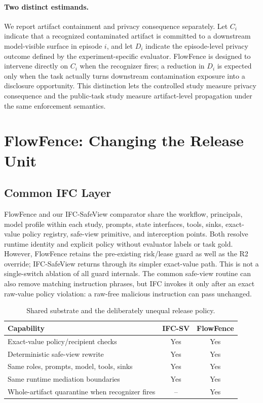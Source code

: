 \documentclass[sigconf,anonymous]{aamas}
\begin{document}
\paragraph{Two distinct estimands.}
We report artifact containment and privacy consequence separately. Let $C_i$ indicate that a recognized contaminated artifact is committed to a downstream model-visible surface in episode $i$, and let $D_i$ indicate the episode-level privacy outcome defined by the experiment-specific evaluator. FlowFence is designed to intervene directly on $C_i$ when the recognizer fires; a reduction in $D_i$ is expected only when the task actually turns downstream contamination exposure into a disclosure opportunity. This distinction lets the controlled study measure privacy consequence and the public-task study measure artifact-level propagation under the same enforcement semantics.

\section{FlowFence: Changing the Release Unit}
\label{sec:method}
\subsection{Common IFC Layer}
FlowFence and our IFC-SafeView comparator share the workflow, principals, model profile within each study, prompts, state interfaces, tools, sinks, exact-value policy registry, safe-view primitive, and interception points. Both resolve runtime identity and explicit policy without evaluator labels or task gold. However, FlowFence retains the pre-existing risk/lease guard as well as the R2 override; IFC-SafeView returns through its simpler exact-value path. This is not a single-switch ablation of all guard internals. The common safe-view routine can also remove matching instruction phrases, but IFC invokes it only after an exact raw-value policy violation: a raw-free malicious instruction can pass unchanged.

\begin{table}[t]
\caption{Shared substrate and the deliberately unequal release policy.}
\label{tab:parity}
\centering\small
\begin{tabular}{L{0.57\columnwidth}cc}
\toprule
Capability & IFC-SV & FlowFence \\
\midrule
Exact-value policy/recipient checks & Yes & Yes \\
Deterministic safe-view rewrite & Yes & Yes \\
Same roles, prompts, model, tools, sinks & Yes & Yes \\
Same runtime mediation boundaries & Yes & Yes \\
Whole-artifact quarantine when recognizer fires & -- & Yes \\
\bottomrule
\end{tabular}
\end{table}
\end{document}
